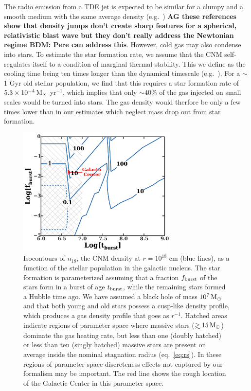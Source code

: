 \documentclass[usenatbib,fleqn]{mnras}
\newcommand\gsim{\mathrel{\rlap{\lower4pt\hbox{\hskip1pt$\sim$}}
    \raise1pt\hbox{$>$}}}
\newcommand{\Msun}{{\rm M_\odot}}
\begin{document}
The radio emission from a TDE jet is expected to be similar for a
clumpy and a smooth medium with the same average density
(e.g.~\citealt{Nakar&Granot2007,van-Eerten+2009,Mimica&Giannios2011})
{\bf AG these references show that density jumps don't create sharp
  features for a spherical, relativistic blast wave but they don't
  really address the Newtonian regime  BDM: Pere can address this}.  However, cold
gas may also condense into stars.  To estimate the star formation
rate, we assume that the CNM self-regulates itself to a condition of
marginal thermal stability.  This we define as the cooling time being
ten times longer than the dynamical timescale
(e.g.~\citealt{McCourt+09}). For a $\sim$1 Gyr old stellar population,
we find that this requires a star formation rate of $5.3 \times
10^{-4} \,\Msun$ yr$^{-1}$, which implies that only $\sim 40$\% of the
gas injected on small scales would be turned into stars.  The gas
density would therfore be only a few times lower than in our estimates
which neglect mass drop out from star formation.

\begin{figure} 
  \includegraphics[width=8cm]{cnm_plot.pdf}
  \caption{\label{fig:param} Isocontours of $n_{18}$, the CNM density
    at $r = 10^{18}$ cm (blue lines), as a function of the stellar
    population in the galactic nucleus.  The star formation is
    parameterized assuming that a fraction $f_{\rm burst}$ of the
    stars form in a burst of age $t_{\rm burst}$, while the remaining
    stars formed a Hubble time ago.  We have assumed a black hole of
    mass $10^{7} \, \Msun$ and that both young and old stars possess a
    cusp-like density profile, which produces a gas density profile
    that goes as $r^{-1}$.  Hatched areas indicate regions of
    parameter space where massive stars ($\gsim 15 \, \Msun$) dominate
    the gas heating rate, but less than one (doubly hatched) or less
    than ten (singly hatched) massive stars are present on average
    inside the nominal stagnation radius (eq.~\ref{eq:rs}).  In these
    regions of parameter space discreteness effects not captured by
    our formalism may be important. The red line shows the rough location of
    the Galactic Center in this parameter space.}
\end{figure}
\end{document}
